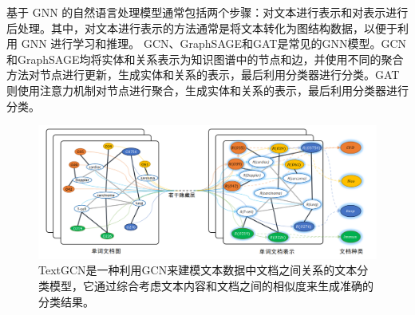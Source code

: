 基于 GNN 的自然语言处理模型通常包括两个步骤：对文本进行表示和对表示进行后处理。其中，对文本进行表示的方法通常是将文本转化为图结构数据，以便于利用 GNN 进行学习和推理。
GCN、GraphSAGE和GAT是常见的GNN模型。GCN和GraphSAGE均将实体和关系表示为知识图谱中的节点和边，并使用不同的聚合方法对节点进行更新，生成实体和关系的表示，最后利用分类器进行分类。GAT则使用注意力机制对节点进行聚合，生成实体和关系的表示，最后利用分类器进行分类。



\begin{figure}[ht]
    \vspace{6pt}
	\centering
    \includegraphics[width=\linewidth]{figures/textgcn.png}
	\caption{TextGCN是一种利用GCN来建模文本数据中文档之间关系的文本分类模型，它通过综合考虑文本内容和文档之间的相似度来生成准确的分类结果。}
    \label{fig:textgcn}
    \vspace{6pt}
\end{figure}


